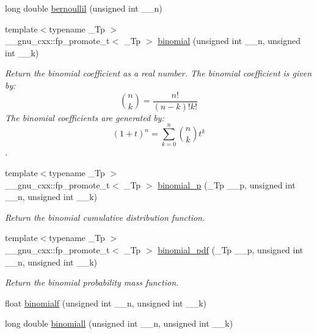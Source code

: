 \begin{DoxyCompactItemize}
\item 
long double \hyperlink{group__gnu__math__spec__func_gaac8f04abfdd6b744d11cb73ec1f564b1}{bernoullil} (unsigned int \+\_\+\+\_\+n)
\item 
{\footnotesize template$<$typename \+\_\+\+Tp $>$ }\\\+\_\+\+\_\+gnu\+\_\+cxx\+::fp\+\_\+promote\+\_\+t$<$ \+\_\+\+Tp $>$ \hyperlink{group__gnu__math__spec__func_gabd0cf6e3f1e1d36c4c45f118e34a5ca2}{binomial} (unsigned int \+\_\+\+\_\+n, unsigned int \+\_\+\+\_\+k)
\begin{DoxyCompactList}\small\item\em Return the binomial coefficient as a real number. The binomial coefficient is given by\+: \[ \binom{n}{k} = \frac{n!}{(n-k)! k!} \] The binomial coefficients are generated by\+: \[ \left(1 + t\right)^n = \sum_{k=0}^n \binom{n}{k} t^k \]. \end{DoxyCompactList}\item 
{\footnotesize template$<$typename \+\_\+\+Tp $>$ }\\\+\_\+\+\_\+gnu\+\_\+cxx\+::fp\+\_\+promote\+\_\+t$<$ \+\_\+\+Tp $>$ \hyperlink{group__gnu__math__spec__func_ga54276b9f03ad7b10e991b1681e0d2dd3}{binomial\+\_\+p} (\+\_\+\+Tp \+\_\+\+\_\+p, unsigned int \+\_\+\+\_\+n, unsigned int \+\_\+\+\_\+k)
\begin{DoxyCompactList}\small\item\em Return the binomial cumulative distribution function. \end{DoxyCompactList}\item 
{\footnotesize template$<$typename \+\_\+\+Tp $>$ }\\\+\_\+\+\_\+gnu\+\_\+cxx\+::fp\+\_\+promote\+\_\+t$<$ \+\_\+\+Tp $>$ \hyperlink{group__gnu__math__spec__func_gab726f5ed3181466baa0374e723ab5fb2}{binomial\+\_\+pdf} (\+\_\+\+Tp \+\_\+\+\_\+p, unsigned int \+\_\+\+\_\+n, unsigned int \+\_\+\+\_\+k)
\begin{DoxyCompactList}\small\item\em Return the binomial probability mass function. \end{DoxyCompactList}\item 
float \hyperlink{group__gnu__math__spec__func_ga3882a077dacc6e627ca48abc05d7db48}{binomialf} (unsigned int \+\_\+\+\_\+n, unsigned int \+\_\+\+\_\+k)
\item 
long double \hyperlink{group__gnu__math__spec__func_ga57602195f9215f735793c11d3210ac93}{binomiall} (unsigned int \+\_\+\+\_\+n, unsigned int \+\_\+\+\_\+k)
\item 

\end{DoxyCompactItemize}
